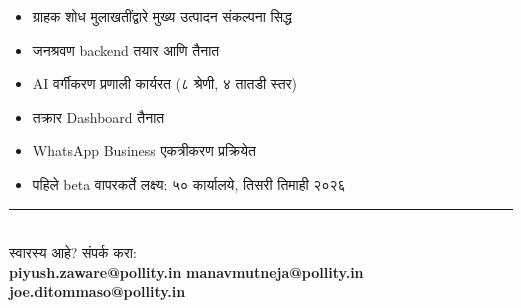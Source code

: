 \documentclass[11pt, a4paper]{article}
\begin{document}
\begin{tcolorbox}[colback=lightgray, colframe=pollityblue, sharp corners, boxrule=0.5pt]
\begin{itemize}[leftmargin=1.5em, itemsep=3pt, topsep=2pt]
  \item[$\checkmark$] ग्राहक शोध मुलाखतींद्वारे मुख्य उत्पादन संकल्पना सिद्ध
  \item[$\checkmark$] जनश्रवण \textenglish{backend} तयार आणि तैनात
  \item[$\checkmark$] \textenglish{AI} वर्गीकरण प्रणाली कार्यरत (८ श्रेणी, ४ तातडी स्तर)
  \item[$\checkmark$] तक्रार \textenglish{Dashboard} तैनात
  \item[$\rightarrow$] \textenglish{WhatsApp Business} एकत्रीकरण प्रक्रियेत
  \item[$\rightarrow$] पहिले \textenglish{beta} वापरकर्ते लक्ष्य: ५० कार्यालये, तिसरी तिमाही २०२६
\end{itemize}
\end{tcolorbox}

\vspace{1em}
\begin{center}
{\color{pollityblue}\rule{0.5\linewidth}{0.4pt}}\\[0.5em]
{\small स्वारस्य आहे? संपर्क करा:}\\[0.3em]
{\small \textbf{\textenglish{piyush.zaware@pollity.in}} \textbar{} \textbf{\textenglish{manavmutneja@pollity.in}} \textbar{} \textbf{\textenglish{joe.ditommaso@pollity.in}}}
\end{center}
\end{document}
